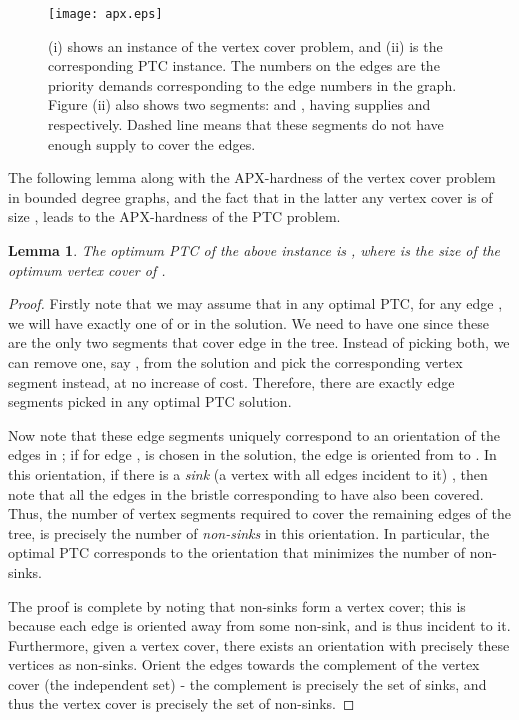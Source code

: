 \documentclass[11pt]{article}
\newtheorem{lemma}{Lemma}
\newcommand{\1}{\mathbb{1}}
\begin{document}
{\begin{figure}
  \begin{center}
    \texttt{[image: apx.eps]}
  \end{center}
  \caption{\label{fig:red} (i) shows an instance of
    the vertex cover problem, and (ii) is the
    corresponding PTC instance. The numbers on the edges are the
    priority demands corresponding to the edge numbers in the
    graph. Figure (ii) also shows two 
    segments:  and , having supplies  and 
    respectively.  Dashed line means that these segments do not have
    enough supply to cover the edges.}
\end{figure}

The following lemma along with the APX-hardness of the vertex cover
problem in bounded degree graphs, and the fact that in the latter any
vertex cover is of size , leads to the APX-hardness of the
PTC problem.

\begin{lemma}
The optimum PTC of the above instance is , where  is the size of the optimum vertex cover of .
\end{lemma}
\begin{proof}
  Firstly note that we may assume that in any optimal PTC, for any
  edge , we will have exactly one of  or  in
  the solution. We need to have one since these are the only two
  segments that cover edge  in the tree. Instead of picking
  both, we can remove one, say , from the solution and pick the
  corresponding vertex segment  instead, at no increase of
  cost. Therefore, there are exactly  edge segments picked in any
  optimal PTC solution.

  Now note that these  edge segments uniquely correspond to an
  orientation of the edges in ; if for edge ,  is
  chosen in the solution, the edge  is oriented from  to
  .  In this orientation, if there is a {\em sink} (a vertex with
  all edges incident to it) , then note that all the edges in the
  bristle corresponding to  have also been covered. Thus, the
  number of vertex segments required to cover the remaining edges of
  the tree, is precisely the number of {\em non-sinks} in this
  orientation. In particular, the optimal PTC corresponds to the
  orientation that minimizes the number of non-sinks.

  The proof is complete by noting that non-sinks form a vertex cover;
  this is because each edge is oriented away from some non-sink, and
  is thus incident to it. Furthermore, given a vertex cover, there
  exists an orientation with precisely these vertices as
  non-sinks. Orient the edges towards the complement of the vertex
  cover (the independent set) - the complement is precisely the set of
  sinks, and thus the vertex cover is precisely the set of non-sinks.
\end{proof}

}
\end{document}
